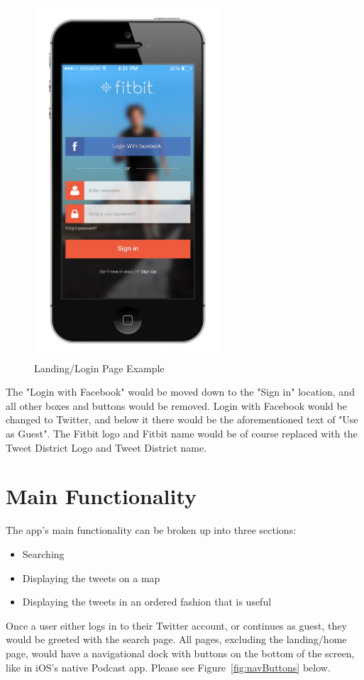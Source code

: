 \documentclass[11pt]{article}
\begin{document}
\begin{figure}[H]
    \centering
    \includegraphics[width=7cm]{loginIdea}
    \caption{Landing/Login Page Example}  
    \label{fig:loginMock}          
\end{figure}

The "Login with Facebook" would be moved down to the "Sign in" location, and all other boxes and buttons would be removed. Login with Facebook would be changed to Twitter, and below it there would be the aforementioned text of "Use as Guest". The Fitbit logo and Fitbit name would be of course replaced with the Tweet District Logo and Tweet District name.

\section{Main Functionality}
The app's main functionality can be broken up into three sections:
\begin{itemize}
\item Searching
\item Displaying the tweets on a map
\item Displaying the tweets in an ordered fashion that is useful
\end{itemize}

Once a user either logs in to their Twitter account, or continues as guest, they would be greeted with the search page. All pages, excluding the landing/home page, would have a navigational dock with buttons on the bottom of the screen, like in iOS's native Podcast app. Please see Figure~\ref{fig:navButtons} below.
\end{document}
